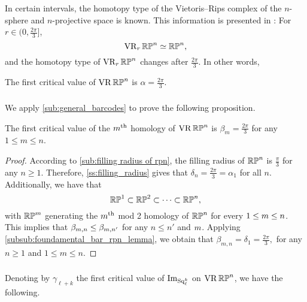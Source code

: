 \subsubsection{}
\label{subsub:rpn homotopy type}

In certain intervals, the homotopy type of the Vietoris--Rips complex of the $n$-sphere and $n$-projective space is known.
This information is presented in \cite[Thm.~4.5]{adams2022metric}:
For $r \in (0,\frac{2\pi}{3} ]$,
\[
\operatorname{VR}_r\mathbb{RP}^n \simeq \mathbb{RP}^n,
\]
and the homotopy type of $\operatorname{VR}_r\mathbb{RP}^n$ changes after $\tfrac{2\pi}{3}$.
In other words,

\medskip\proposition
The first critical value of \(\operatorname{VR}\mathbb{RP}^n\) is \(\alpha = \frac{2\pi}{3}\).

\subsubsection{}
\label{subsub:beta_m_rpn}

We apply \cref{sub:general_barcodes} to prove the following proposition.

\medskip\proposition
The first critical value of the $m^{\mathrm{th}}$ homology of $\operatorname{VR}\mathbb{RP}^n$ is $\beta_m=\frac{2\pi}{3}$ for any $1\leq m\leq n$.

\begin{proof}%
	According to \cref{sub:filling radius of rpn}, the filling radius of $\mathbb{RP}^n$ is $\frac{\pi}{3}$ for any $n \geq 1$.
	Therefore, \cref{ss:filling_radius} gives that $\delta_n = \tfrac{2\pi}{3} = \alpha_1$ for all $n$.
	Additionally, we have that
	\[
	\mathbb{RP}^1 \subset \mathbb{RP}^2 \subset \dots \subset \mathbb{RP}^n,
	\]
	with $\mathbb{RP}^m$ generating the $m^{\mathrm{th}}$ mod 2 homology of $\mathbb{RP}^n$ for every $1 \leq m \leq n$.
	This implies that $\beta_{m, n} \leq \beta_{m, n'}$ for any $n\leq n'$ and $m$.
	Applying \cref{subsub:foundamental_bar_rpn_lemma}, we obtain that $\beta_{m,n} = \delta_1 = \tfrac{2\pi}{3},$ for any $n\geq 1$ and $1 \leq m \leq n$.
\end{proof}

\subsubsection{}
\label{subsub:gamma_rpn}

Denoting by \(\gamma_{\ell+k}\) the first critical value of \(\operatorname{Im}_{\operatorname{Sq}^k_\ell}\) on \(\operatorname{VR}\mathbb{RP}^n\), we have the following.

